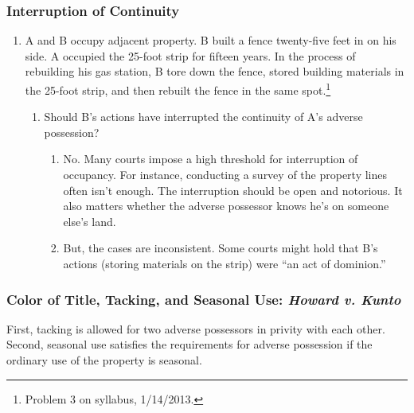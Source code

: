 \subsubsection{Interruption of Continuity}

\begin{enumerate}
    \item A and B occupy adjacent property. B built a fence twenty-five feet 
    in on his side. A occupied the 25-foot strip for fifteen years. In the 
    process of rebuilding his gas station, B tore down the fence, stored 
    building materials in the 25-foot strip, and then rebuilt the fence in the 
    same spot.\footnote{Problem 3 on syllabus, 1/14/2013.}
    \begin{enumerate}
        \item Should B's actions have interrupted the continuity of A's 
        adverse possession?
        \begin{enumerate}
            \item No. Many courts impose a high threshold for interruption of 
            occupancy. For instance, conducting a survey of the property lines 
            often isn't enough. The interruption should be open and notorious. 
            It also matters whether the adverse possessor knows he's on 
            someone else's land.
            \item But, the cases are inconsistent. Some courts might hold that 
            B's actions (storing materials on the strip) were ``an act of 
            dominion.''
        \end{enumerate}
    \end{enumerate}
\end{enumerate}

\subsubsection{Color of Title, Tacking, and Seasonal Use: \emph{Howard v. 
Kunto}}

First, tacking is allowed for two adverse possessors in privity with each 
other. Second, seasonal use satisfies the requirements for adverse possession 
if the ordinary use of the property is seasonal.

